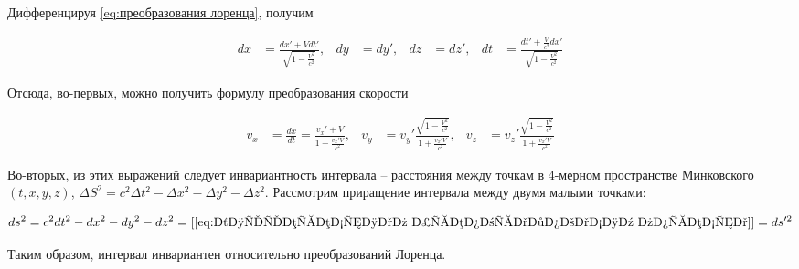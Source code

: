 \noindent
Дифференцируя \eqref{eq:преобразования лоренца}, получим

\begin{align}
    dx &= \frac{dx' + V dt'}{\sqrt{1 - \frac{V^2}{c^2}}}, & dy &= dy', & dz &= dz', & dt &= \frac{dt' + \frac{V}{c^2}dx'}{\sqrt{1-\frac{V^2}{c^2}}}
\end{align}

\noindent
Отсюда, во-первых, можно получить формулу преобразования скорости

\begin{align} \label{eq:дифференциал преобразований лоренца}
    v_x &= \frac{dx}{dt} = \frac{v_x' + V}{1 + \frac{v_x'V}{c^2}}, & v_y &= v_y' \frac{\sqrt{1 - \frac{V^2}{c^2}}}{1 + \frac{v_x' V}{c^2}}, & v_z &= v_z' \frac{\sqrt{1 - \frac{V^2}{c^2}}}{1 + \frac{v_x' V}{c^2}}
\end{align}

\noindent
Во-вторых, из этих выражений следует инвариантность интервала -- расстояния между точкам в 4-мерном пространстве Минковского $(t, x, y, z)$, $\Delta S^2 = c^2 \Delta t^2 - \Delta x^2 - \Delta y^2 - \Delta z^2$. Рассмотрим приращение интервала между двумя малыми точками:

\begin{equation}
    ds^2 = c^2dt^2 - dx^2 - dy^2 - dz^2 = [\eqref{eq:дифференциал преобразований лоренца}] = ds'^2
\end{equation}

\noindent
Таким образом, интервал инвариантен относительно преобразований Лоренца.
